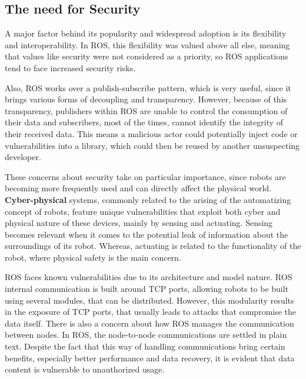 \subsection{The need for Security}
        
A major factor behind its popularity and widespread adoption is its flexibility and interoperability. In ROS, this flexibility was valued above all else, meaning that values like security were not considered as a priority, so ROS applications tend to face increased security risks. 
            
Also, ROS works over a publish-subscribe pattern, which is very useful, since it brings various forms of decoupling and transparency. However, because of this transparency, publishers within ROS are unable to control the consumption of their data and subscribers, most of the times, cannot identify the integrity of their received data. %
This means a malicious actor could potentially inject code or vulnerabilities into a library, which could then be reused by another unsuspecting developer.

These concerns about security take on particular importance, since robots are becoming more frequently used and can directly affect the physical world. \textbf{Cyber-physical} systems, commonly related to the arising of the automatizing concept of robots, feature unique vulnerabilities that exploit both cyber and physical nature of these devices, mainly by sensing and actuating. Sensing becomes relevant when it comes to the potential leak of information about the surroundings of its robot. Whereas, actuating is related to the functionality of the robot, where physical safety is the main concern.\cite{8794451, mcclean2013preliminary} %

ROS faces known vulnerabilities due to its architecture and model nature. ROS internal communication is built around TCP ports, allowing robots to be built using several modules, that can be distributed. However, this modularity results in the exposure of TCP ports, that usually leads to attacks that compromise the data itself.
There is also a concern about how ROS manages the communication between nodes. In ROS, the node-to-node communications are settled in plain text. Despite the fact that this way of handling communications bring certain benefits, especially better performance and data recovery, it is evident that data content is vulnerable to unauthorized usage.

